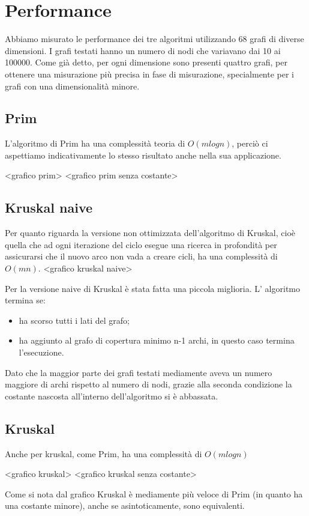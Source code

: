 \section{Performance}
Abbiamo misurato le performance dei tre algoritmi utilizzando 68 grafi di diverse dimensioni.
I grafi testati hanno un numero di nodi che variavano dai  10 ai 100000.
Come già detto, per ogni dimensione sono presenti quattro grafi, per ottenere una misurazione più precisa in fase di misurazione, specialmente per i grafi con una dimensionalità minore.
\subsection{Prim}
L'algoritmo di Prim ha una complessità teoria di $O(mlogn)$, perciò ci aspettiamo indicativamente lo stesso risultato anche nella sua applicazione.

<grafico prim>
<grafico prim senza costante>
\subsection{Kruskal naive}
Per quanto riguarda la versione non ottimizzata dell'algoritmo di Kruskal, cioè quella che ad ogni iterazione del ciclo esegue una ricerca in profondità per assicurarsi che il nuovo arco non vada a creare cicli, ha una complessità di $O(mn)$.
<grafico kruskal naive>

Per la versione naive di Kruskal è stata fatta una piccola miglioria. L' algoritmo termina se:
\begin{itemize}
    \item ha scorso tutti i lati del grafo;
    \item ha aggiunto al grafo di copertura minimo n-1 archi, in questo caso termina l'esecuzione.
\end{itemize}
Dato che la maggior parte dei grafi testati mediamente aveva un numero maggiore di archi rispetto al numero di nodi, grazie alla seconda condizione la costante nascosta all'interno dell'algoritmo si è abbassata. 

\subsection{Kruskal}
Anche per kruskal, come Prim, ha una complessità di $O(mlogn)$

<grafico kruskal>
<grafico kruskal senza costante>

Come si nota dal grafico Kruskal è mediamente più veloce di Prim (in quanto ha una costante minore), anche se asintoticamente, sono equivalenti.

